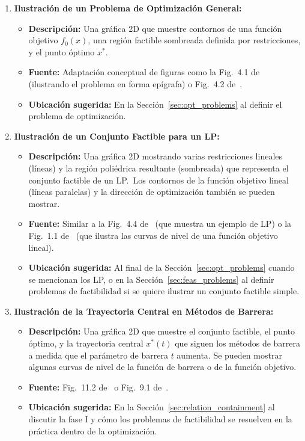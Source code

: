 \begin{enumerate}
    \item \textbf{Ilustración de un Problema de Optimización General:}
    \begin{itemize}
        \item \textbf{Descripción:} Una gráfica 2D que muestre contornos de una función objetivo $f_0(x)$,
              una región factible sombreada definida por restricciones, y el punto óptimo $x^*$.
        \item \textbf{Fuente:} Adaptación conceptual de figuras como la Fig.~4.1 de~\cite[p.~135]{BoydVandenberghe2004}
              (ilustrando el problema en forma epígrafa) o Fig.~4.2 de~\cite[p.~98]{BoydVandenbergheSlides2023}.
        \item \textbf{Ubicación sugerida:} En la Sección~\ref{sec:opt_problems} al definir el problema de optimización.
    \end{itemize}

    \item \textbf{Ilustración de un Conjunto Factible para un LP:}
    \begin{itemize}
        \item \textbf{Descripción:} Una gráfica 2D mostrando varias restricciones lineales (líneas) y la región
              poliédrica resultante (sombreada) que representa el conjunto factible de un LP.\ Los contornos de la
              función objetivo lineal (líneas paralelas) y la dirección de optimización también se pueden mostrar.
        \item \textbf{Fuente:} Similar a la Fig.~4.4 de~\cite[p.~147]{BoydVandenberghe2004} (que muestra un ejemplo
              de LP) o la Fig.~1.1 de~\cite[p.~101]{BoydVandenbergheSlides2023} (que ilustra las curvas de nivel de
              una función objetivo lineal).
        \item \textbf{Ubicación sugerida:} Al final de la Sección~\ref{sec:opt_problems} cuando se mencionan los LP,
              o en la Sección~\ref{sec:feas_problems} al definir problemas de factibilidad si se quiere ilustrar un
              conjunto factible simple.
    \end{itemize}

    \item \textbf{Ilustración de la Trayectoria Central en Métodos de Barrera:}
    \begin{itemize}
        \item \textbf{Descripción:} Una gráfica 2D que muestre el conjunto factible, el punto óptimo, y la trayectoria
              central $x^*(t)$ que siguen los métodos de barrera a medida que el parámetro de barrera $t$ aumenta.
              Se pueden mostrar algunas curvas de nivel de la función de barrera o de la función objetivo.
        \item \textbf{Fuente:} Fig.~11.2 de~\cite[p.~565]{BoydVandenberghe2004} o Fig.~9.1 de~\cite[p.~361]{BoydVandenbergheSlides2023}.
        \item \textbf{Ubicación sugerida:} En la Sección~\ref{sec:relation_containment} al discutir la fase I y cómo
              los problemas de factibilidad se resuelven en la práctica dentro de la optimización.
    \end{itemize}
\end{enumerate}